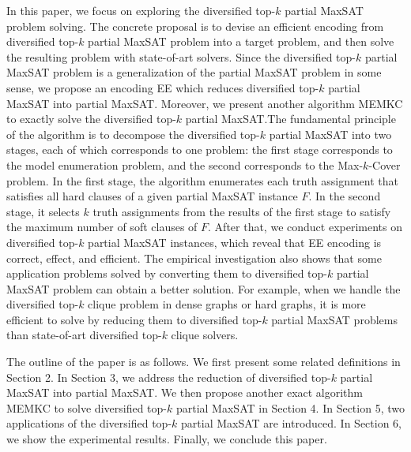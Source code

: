 \documentclass{llncs}
\begin{document}
In this paper, we focus on exploring the diversified top-$k$ partial MaxSAT problem solving. The concrete proposal is to devise an efficient encoding from diversified top-$k$ partial MaxSAT problem into a target problem, and then solve the resulting problem with state-of-art solvers. Since the diversified top-$k$ partial MaxSAT problem is a generalization of the partial MaxSAT problem in some sense, we propose an encoding EE which reduces diversified top-$k$ partial MaxSAT into partial MaxSAT. Moreover, we present another algorithm MEMKC to exactly solve the diversified top-$k$ partial MaxSAT.The fundamental principle of the algorithm is to decompose the diversified top-$k$ partial MaxSAT into two stages, each of which corresponds to one problem: the first stage corresponds to the model enumeration problem, and the second corresponds to the Max-$k$-Cover problem. In the first stage, the algorithm enumerates each truth assignment that satisfies all hard clauses of a given partial MaxSAT instance $F$. In the second stage, it selects $k$ truth assignments from the results of the first stage to satisfy the maximum number of soft clauses of $F$. After that, we conduct experiments on diversified top-$k$ partial MaxSAT instances, which reveal that EE encoding is correct, effect, and efficient. The empirical investigation also shows that some application problems solved by converting them to diversified top-$k$ partial MaxSAT problem can obtain a better solution. For example, when we handle the diversified top-$k$ clique problem in dense graphs or hard graphs, it is more efficient to solve by reducing them to diversified top-$k$ partial MaxSAT problems than state-of-art diversified top-$k$ clique solvers.

The outline of the paper is as follows. We first present some related definitions in Section 2. In Section 3, we address the reduction of diversified top-$k$ partial MaxSAT into partial MaxSAT. We then propose another exact algorithm MEMKC to solve diversified top-$k$ partial MaxSAT in Section 4. In Section 5, two applications of the diversified top-$k$ partial MaxSAT are introduced. In Section 6, we show the experimental results. Finally, we conclude this paper.
\end{document}
